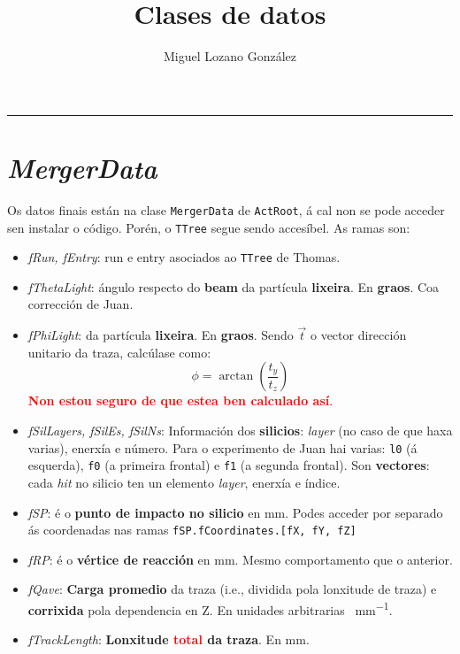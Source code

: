 \documentclass[11pt, a4paper, galician]{article}
\title{\textbf{Clases de datos}}
\author{Miguel Lozano González\\
	}
\date{\empty}%
\begin{document}
\begin{minipage}{0.48\linewidth}
	\maketitle
\end{minipage}\hfill
\begin{minipage}{0.48\linewidth}
	\tableofcontents
\end{minipage}

\noindent\rule{\textwidth}{1pt}

\section{\textit{MergerData}}
Os datos finais están na clase \lstinline{MergerData} de \lstinline{ActRoot}, á cal non se pode acceder sen instalar o código. Porén, o \lstinline{TTree} segue sendo accesíbel. As ramas son:
\begin{itemize}
    \item \textit{fRun, fEntry}: run e entry asociados ao \lstinline|TTree| de Thomas.
    \item \textit{fThetaLight}: ángulo respecto do \textbf{beam} da partícula \textbf{lixeira}. En \textbf{graos}. Coa corrección de Juan.
    \item \textit{fPhiLight}: da partícula \textbf{lixeira}. En \textbf{graos}. Sendo $\vec{t}$ o vector dirección unitario da traza, calcúlase como:
    \begin{equation*}
        \phi = \arctan\left(\frac{t_y}{t_z}\right)
    \end{equation*}
    \textcolor{red}{\textbf{Non estou seguro de que estea ben calculado así}}.
    \item \textit{fSilLayers, fSilEs, fSilNs}: Información dos \textbf{silicios}: \textit{layer} (no caso de que haxa varias), enerxía e número. Para o experimento de Juan hai varias: \lstinline|l0| (á esquerda), \lstinline|f0| (a primeira frontal) e \lstinline|f1| (a segunda frontal). Son \textbf{vectores}: cada \textit{hit} no silicio ten un elemento \textit{layer}, enerxía e índice.
    \item \textit{fSP}: é o \textbf{punto de impacto no silicio} en \unit{\mm}. Podes acceder por separado ás coordenadas nas ramas \lstinline|fSP.fCoordinates.[fX, fY, fZ]|
    \item \textit{fRP}: é o \textbf{vértice de reacción} en \unit{\mm}. Mesmo comportamento que o anterior.
    \item \textit{fQave}: \textbf{Carga promedio} da traza (i.e., dividida pola lonxitude de traza) e \textbf{corrixida} pola dependencia en Z. En unidades arbitrarias \unit{\cdot\per\mm}.
    \item \textit{fTrackLength}: \textbf{Lonxitude \textcolor{red}{total} da traza}. En \unit{\mm}.
\end{itemize}
\end{document}

